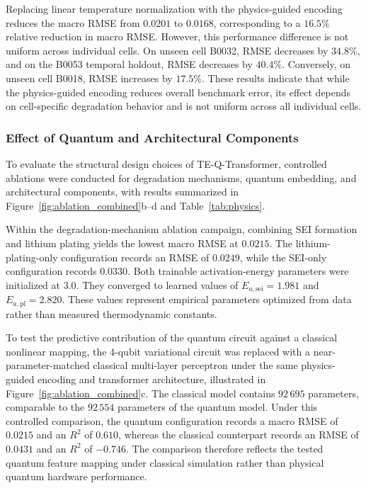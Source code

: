 \documentclass[a4paper,fleqn]{cas-sc}
\begin{document}
Replacing linear temperature normalization with the physics-guided encoding reduces the macro RMSE from $0.0201$ to $0.0168$, corresponding to a $16.5\%$ relative reduction in macro RMSE. However, this performance difference is not uniform across individual cells. On unseen cell B0032, RMSE decreases by $34.8\%$, and on the B0053 temporal holdout, RMSE decreases by $40.4\%$. Conversely, on unseen cell B0018, RMSE increases by $17.5\%$. These results indicate that while the physics-guided encoding reduces overall benchmark error, its effect depends on cell-specific degradation behavior and is not uniform across all individual cells.

\subsubsection{Effect of Quantum and Architectural Components}\label{sec:study_components}

To evaluate the structural design choices of TE-Q-Transformer, controlled ablations were conducted for degradation mechanisms, quantum embedding, and architectural components, with results summarized in Figure~\ref{fig:ablation_combined}b--d and Table~\ref{tab:physics}.

Within the degradation-mechanism ablation campaign, combining SEI formation and lithium plating yields the lowest macro RMSE at $0.0215$. The lithium-plating-only configuration records an RMSE of $0.0249$, while the SEI-only configuration records $0.0330$. Both trainable activation-energy parameters were initialized at $3.0$. They converged to learned values of $E_{a,\mathrm{sei}} = 1.981$ and $E_{a,\mathrm{pl}} = 2.820$. These values represent empirical parameters optimized from data rather than measured thermodynamic constants.

To test the predictive contribution of the quantum circuit against a classical nonlinear mapping, the 4-qubit variational circuit was replaced with a near-parameter-matched classical multi-layer perceptron under the same physics-guided encoding and transformer architecture, illustrated in Figure~\ref{fig:ablation_combined}c. The classical model contains $92\,695$ parameters, comparable to the $92\,554$ parameters of the quantum model. Under this controlled comparison, the quantum configuration records a macro RMSE of $0.0215$ and an $R^2$ of $0.610$, whereas the classical counterpart records an RMSE of $0.0431$ and an $R^2$ of $-0.746$. The comparison therefore reflects the tested quantum feature mapping under classical simulation rather than physical quantum hardware performance.
\end{document}
